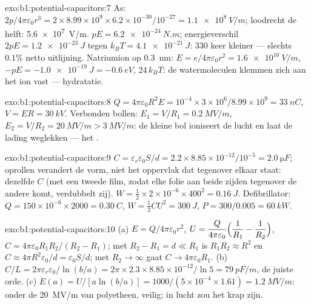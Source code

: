 \begin{solution}{exo:b1:potential-capacitors:7}
As: $2p/4\pi\varepsilon_0r^3 = 2 \times 8.99 \times 10^9 \times 6.2 \times 10^{-30}/10^{-27} =
\qty{1.1e8}{V/m}$; loodrecht de helft: \qty{5.6e7}{V/m}.  $pE =
\qty{6.2e-24}{N.m}$; energieverschil $2pE = \qty{1.2e-23}{J}$ tegen $k_BT =
\qty{4.1e-21}{J}$: $330$ keer kleiner --- slechts $0.1\%$ netto uitlijning.
Natriumion op \qty{0.3}{nm}: $E = e/4\pi\varepsilon_0r^2 = \qty{1.6e10}{V/m}$, $-pE
= \qty{-1.0e-19}{J} = \qty{-0.6}{eV}$, $24\,k_BT$: de watermoleculen klemmen
zich aan het ion vast --- hydratatie.
\end{solution}

\begin{solution}{exo:b1:potential-capacitors:8}
$Q = 4\pi\varepsilon_0R^2E = 10^{-4} \times 3 \times 10^6/8.99 \times 10^9 = \qty{33}{nC}$,
$V = ER = \qty{30}{kV}$. Verbonden bollen: $E_1 = V/R_1 = \qty{0.2}{MV/m}$,
$E_2 = V/R_2 = \qty{20}{MV/m} > \qty{3}{MV/m}$: de kleine bol ioniseert de
lucht en laat de lading weglekken --- het .
\end{solution}

\begin{solution}{exo:b1:potential-capacitors:9}
$C = \varepsilon_r\varepsilon_0S/d = 2.2 \times 8.85 \times 10^{-12}/10^{-5} = \qty{2.0}{\micro F}$;
oprollen verandert de vorm, niet het oppervlak dat tegenover elkaar staat: dezelfde $C$ (met een tweede
film, zodat elke folie aan beide zijden tegenover de andere komt, verdubbelt zij).
$W = \tfrac12 \times 2 \times 10^{-6} \times 400^2 = \qty{0.16}{J}$. Defibrillator:
$Q = 150 \times 10^{-6} \times 2000 = \qty{0.30}{C}$, $W = \tfrac12CU^2 = \qty{300}{J}$,
$P = 300/0.005 = \qty{60}{kW}$.
\end{solution}

\begin{solution}{exo:b1:potential-capacitors:10}
(a) $E = Q/4\pi\varepsilon_0r^2$, $U = \dfrac{Q}{4\pi\varepsilon_0}\Bigl(\dfrac1{R_1} -
\dfrac1{R_2}\Bigr)$, $C = 4\pi\varepsilon_0R_1R_2/(R_2 - R_1)$; met $R_2 - R_1 = d \ll
R_1$ is $R_1R_2 \approx R^2$ en $C \approx 4\pi R^2\varepsilon_0/d = \varepsilon_0S/d$; met $R_2 \to
\infty$ gaat $C \to 4\pi\varepsilon_0R_1$. (b) $C/L = 2\pi\varepsilon_r\varepsilon_0/\ln(b/a) = 2\pi \times 2.3
\times 8.85 \times 10^{-12}/\ln5 = \qty{79}{pF/m}$, de juiste orde. (c) $E(a) =
U/[a\ln(b/a)] = 1000/(5 \times 10^{-4} \times 1.61) = \qty{1.2}{MV/m}$: onder de
\qty{20}{MV/m} van polyetheen, veilig; in lucht zou het krap zijn.
\end{solution}

